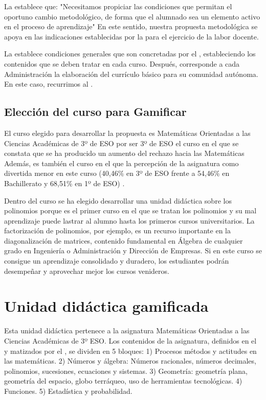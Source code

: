La \lomce establece que: "Necesitamos propiciar las condiciones que permitan el oportuno cambio metodológico, de forma que el alumnado sea un elemento activo en el proceso de aprendizaje" 
%
En este sentido, nuestra propuesta metodológica se apoya en las indicaciones establecidas por la \lomce para el ejercicio de la labor docente.

La \lomce establece condiciones generales que son concretadas por el \boe, estableciendo los contenidos que se deben tratar en cada curso.
%
Después, corresponde a cada Administración la elaboración del currículo básico para su comunidad autónoma.
%
En este caso, recurrimos al \bocm.


\subsection{Elección del curso para Gamificar}

El curso elegido para desarrollar la propuesta es Matemáticas Orientadas a las Ciencias Académicas de 3º de ESO por ser 3º de ESO el curso en el que se constata que se ha producido un aumento del rechazo hacia las Matemáticas  
%
Además, es también el curso en el que la percepción de la asignatura como divertida menor en este curso (40,46\% en 3º de ESO frente a 54,46\% en Bachillerato y 68,51\% en 1º de ESO) \cite{ActitudesHaciaMates}.

Dentro del curso se ha elegido desarrollar una unidad didáctica sobre los polinomios porque es el primer curso en el que se tratan los polinomios y su mal aprendizaje puede lastrar al alumno hasta los primeros cursos universitarios.
%
La factorización de polinomios, por ejemplo, es un recurso importante en la diagonalización de matrices, contenido fundamental en Álgebra de cualquier grado en Ingeniería o Administración y Dirección de Empresas.
%
Si en este curso se consigue un aprendizaje consolidado y duradero, los estudiantes podrán desempeñar y aprovechar mejor los cursos venideros.


\section{Unidad didáctica gamificada}

\label{sec:UD}
%
Esta unidad didáctica pertenece a la asignatura Matemáticas Orientadas a las Ciencias Académicas de 3º ESO. 
%
Los contenidos de la asignatura, definidos en el \boe y matizados por el \bocm, se dividen en 5 bloques:
1) Procesos métodos y actitudes en las matemáticas. 
2) Números y álgebra: Números racionales, números decimales, polinomios, sucesiones, ecuaciones y sistemas.
3) Geometría: geometría plana, geometría del espacio, globo terráqueo, uso de herramientas tecnológicas.
4) Funciones.
5) Estadística y probabilidad.

